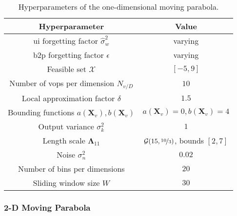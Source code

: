 \bgroup
\def\arraystretch{1}
\begin{table}[h]
    \small
    \centering
    \begin{tabular}{c||c}
        \textbf{Hyperparameter} & \textbf{Value} \\\hline\hline
        \gls{ui} forgetting factor $\hat{\sigma}_w^2$ & varying\\
        \gls{b2p} forgetting factor $\epsilon$ & varying\\
        Feasible set $\mathcal{X}$ & $[-5,9]$\\
        Number of \glspl{vop} per dimension $N_{v/D}$ & $10$\\
        Local approximation factor $\delta$ & $1.5$\\
        Bounding functions $a(\mathbf{X}_v),b(\mathbf{X}_v)$ & $a(\mathbf{X}_v)=0,b(\mathbf{X}_v)=4$\\
        Output variance $\sigma_k^2$ & $1$\\
        Length scale $\boldsymbol\Lambda_{11}$ & $\mathcal{G}(15, \nicefrac{10}{3})$, bounds $[2, 7]$\\
        Noise $\sigma_n^2$ & $0.02$ \\
        Number of bins per dimensions & $20$\\
        Sliding window size $W$ & $30$
    \end{tabular}
    \caption{Hyperparameters of the one-dimensional moving parabola.}
    \label{tab:params_parabola_1D}
\end{table}
\egroup

\subsubsection{2-D Moving Parabola}

